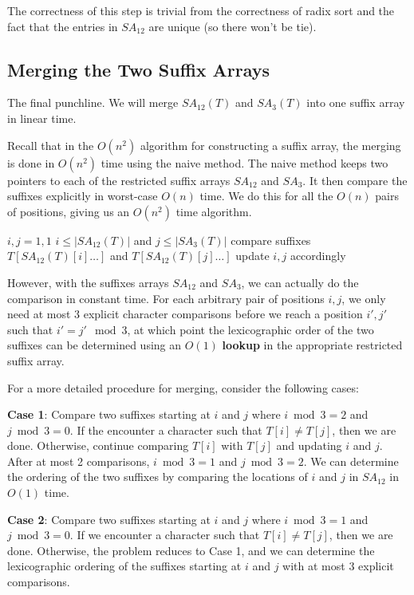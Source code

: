 The correctness of this step is trivial from the correctness of radix sort and the fact that the entries in $SA_{12}$ are unique (so there won't be tie).

\subsection{Merging the Two Suffix Arrays}

The final punchline. We will merge $SA_{12}(T)$ and $SA_{3}(T)$ into one suffix array in linear time.

Recall that in the $O(n^2)$ algorithm for constructing a suffix array, the merging is done in $O(n^2)$ time using the naive method. The naive method keeps two pointers to each of the restricted suffix arrays $SA_{12}$ and $SA_{3}$. It then compare the suffixes explicitly in worst-case $O(n)$ time. We do this for all the $O(n)$ pairs of positions, giving us an $O(n^2)$ time algorithm.

\begin{codebox}
    \li $i,j = 1,1$ 
    \li \While $i \leq |SA_{12}(T)|$ and $j \leq |SA_{3}(T)|$  \Do
            \li compare suffixes $T[SA_{12}(T)[i] \ldots]$ and $T[SA_{12}(T)[j] \ldots]$
            \li update $i,j$ accordingly
\end{codebox}

However, with the suffixes arrays $SA_{12}$ and $SA_3$, we can actually do the comparison in constant time. For each arbitrary pair of positions $i,j$, we only need at most $3$ explicit character comparisons before we reach a position $i',j'$ such that $i' = j' \mod 3$, at which point the lexicographic order of the two suffixes can be determined using an $O(1)$ \textbf{lookup} in the appropriate restricted suffix array.

For a more detailed procedure for merging, consider the following cases:

\textbf{Case 1}: Compare two suffixes starting at $i$ and $j$ where $i \bmod 3 = 2$ and $j \bmod 3 = 0$. If the encounter a character such that $T[i] \neq T[j]$, then we are done. Otherwise, continue comparing $T[i]$ with $T[j]$ and updating $i$ and $j$. After at most 2 comparisons, $i \bmod 3 = 1$ and $j \bmod 3 = 2$. We can determine the ordering of the two suffixes by comparing the locations of $i$ and $j$ in $SA_{12}$ in $O(1)$ time.

\textbf{Case 2}: Compare two suffixes starting at $i$ and $j$ where $i \bmod 3 = 1$ and $j \bmod 3 = 0$. If we encounter a character such that $T[i] \neq T[j]$, then we are done. Otherwise, the problem reduces to Case 1, and we can determine the lexicographic ordering of the suffixes starting at $i$ and $j$ with at most $3$ explicit comparisons.

